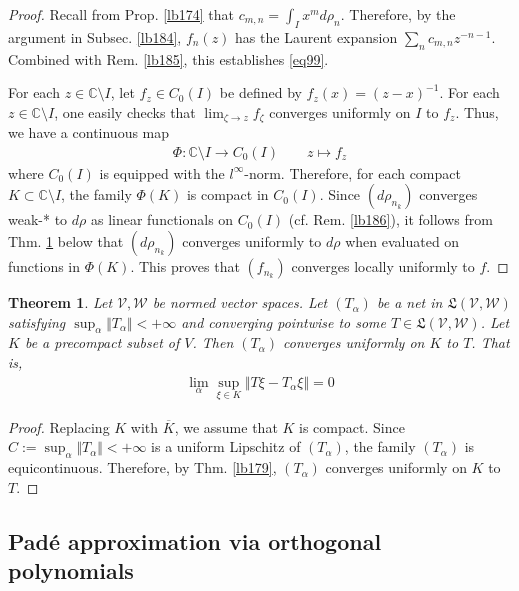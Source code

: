 \documentclass[12pt,b5paper,notitlepage]{article}
\theoremstyle{definition}
\theoremstyle{plain}
\newtheorem{thm}[df]{Theorem}
\newcommand{\fk}{\mathfrak}
\newcommand{\ovl}{\overline}
\newcommand{\Cbb}{\mathbb C}
\newcommand{\MV}{\mathcal V}
\newcommand{\MW}{\mathcal W}
\numberwithin{equation}{section}
\begin{document}
\begin{proof}
Recall from Prop. \ref{lb174} that $c_{m,n}=\int_I x^md\rho_n$. Therefore, by the argument in Subsec. \ref{lb184}, $f_n(z)$ has the Laurent expansion $\sum_n c_{m,n}z^{-n-1}$. Combined with Rem. \ref{lb185}, this establishes \eqref{eq99}.

For each $z\in \Cbb\setminus I$, let $f_z\in C_0(I)$ be defined by $f_z(x)=(z-x)^{-1}$. For each $z\in\Cbb\setminus I$, one easily checks that $\lim_{\zeta\rightarrow z}f_\zeta$ converges uniformly on $I$ to $f_z$. Thus, we have a continuous map
\begin{align*}
\Phi:\Cbb\setminus I\rightarrow C_0(I)\qquad z\mapsto f_z
\end{align*}
where $C_0(I)$ is equipped with the $l^\infty$-norm. Therefore, for each compact $K\subset\Cbb\setminus I$, the family $\Phi(K)$ is compact in $C_0(I)$. Since $(d\rho_{n_k})$  converges weak-* to $d\rho$ as linear functionals on $C_0(I)$ (cf. Rem. \ref{lb186}), it follows from Thm. \ref{lb187} below that $(d\rho_{n_k})$ converges uniformly to $d\rho$ when evaluated on functions in $\Phi(K)$. This proves that $(f_{n_k})$ converges locally uniformly to $f$.
\end{proof}




\begin{thm}\label{lb187}
Let $\MV,\MW$ be normed vector spaces. Let $(T_\alpha)$ be a net in $\fk L(\MV,\MW)$ satisfying $\sup_\alpha \Vert T_\alpha\Vert<+\infty$ and converging pointwise to some $T\in\fk L(\MV,\MW)$. Let $K$ be a precompact subset of $V$. Then $(T_\alpha)$ converges uniformly on $K$ to $T$. That is,
\begin{align*}
\lim_\alpha \sup_{\xi\in K}\Vert T\xi-T_\alpha\xi\Vert=0
\end{align*}
\end{thm}


\begin{proof}
Replacing $K$ with $\ovl K$, we assume that $K$ is compact. Since $C:=\sup_\alpha\Vert T_\alpha\Vert<+\infty$ is a uniform Lipschitz of $(T_\alpha)$, the family $(T_\alpha)$ is equicontinuous. Therefore, by Thm. \ref{lb179}, $(T_\alpha)$ converges uniformly on $K$ to $T$.
\end{proof}


\subsection{Pad\'e approximation via orthogonal polynomials}
\end{document}
